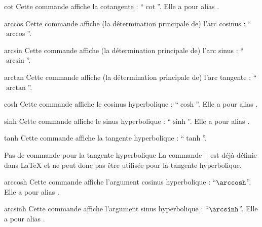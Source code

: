 \documentclass[english,nolocaltoc]{nwejmart}
\newtheorem[style=definition]{fait}
\newtheorem[title=expérience]{experience}
\newtheorem[title-plural=anneaux]{anneau}
\newtheorem[title=idéal,title-plural=idéaux]{ideal}
\begin{document}
\begin{docCommand}{cot}{}
  Cette commande affiche la cotangente : \enquote{$\cot$}. Elle a pour alias
  .
\end{docCommand}

\begin{docCommand}{arccos}{}
  Cette commande affiche (la détermination principale de) l'arc cosinus :
  \enquote{$\arccos$}.
\end{docCommand}

\begin{docCommand}{arcsin}{}
  Cette commande affiche (la détermination principale de) l'arc sinus :
  \enquote{$\arcsin$}.
\end{docCommand}

\begin{docCommand}{arctan}{}
  Cette commande affiche (la détermination principale de) l'arc tangente :
  \enquote{$\arctan$}.
\end{docCommand}

\begin{docCommand}{cosh}{}
  Cette commande affiche le cosinus hyperbolique : \enquote{$\cosh$}. Elle a pour
  alias .
\end{docCommand}

\begin{docCommand}{sinh}{}
  Cette commande affiche le sinus hyperbolique : \enquote{$\sinh$}. Elle a pour
  alias .
\end{docCommand}

\begin{docCommand}{tanh}{}
  Cette commande affiche la tangente hyperbolique : \enquote{$\tanh$}.
  \begin{dbremark}{Pas de commande \protect{} pour la tangente hyperbolique}{}
    La commande |\th| est déjà définie dans \LaTeX{} et ne peut donc pas être
    utilisée pour la tangente hyperbolique.
  \end{dbremark}
\end{docCommand}

\begin{docCommand}{arccosh}{}
  Cette commande affiche l'argument cosinus hyperbolique :
  \enquote{$\arccosh$}. Elle a pour alias .
\end{docCommand}

\begin{docCommand}{arcsinh}{}
  Cette commande affiche l'argument sinus hyperbolique :
  \enquote{$\arcsinh$}. Elle a pour alias .
\end{docCommand}
\end{document}
